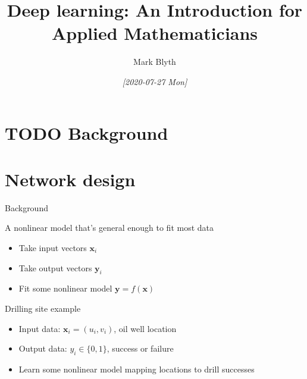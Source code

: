 \documentclass[presentation]{beamer}
\author{Mark Blyth}
\date{\textit{[2020-07-27 Mon]}}
\title{Deep learning: An Introduction for Applied Mathematicians}
\begin{document}
\maketitle

\section{{\bfseries\sffamily TODO} Background}
\label{sec:org1544ad8}


\section{Network design}
\label{sec:orge45367f}
\begin{frame}[<+->][label={sec:org565ed6f}]{Background}
\begin{definition}
A nonlinear model that's general enough to fit most data
\end{definition}

\vfill
\begin{itemize}
\item Take input vectors \(\mathbf{x}_i\)
\item Take output vectors \(\mathbf{y}_i\)
\item Fit some nonlinear model \(\mathbf{y} = f(\mathbf{x})\)
\end{itemize}
\end{frame}

\begin{frame}[label={sec:org37b6e12}]{Drilling site example}
\begin{itemize}
\item Input data: \(\mathbf{x}_i = (u_i, v_i)\), oil well location
\item Output data: \(y_i\in\{0,1\}\), success or failure
\item Learn some nonlinear model mapping locations to drill successes
\end{itemize}
\end{frame}
\end{document}

